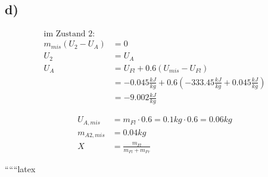 

\subsection*{d)}

\begin{align*}
\text{im Zustand 2:} \\
m_{mis} (U_2 - U_A) &= 0 \\
U_2 &= U_A \\
U_A &= U_{Fl} + 0.6 \left( U_{mis} - U_{Fl} \right) \\
&= -0.045 \frac{kJ}{kg} + 0.6 \left( -333.45 \frac{kJ}{kg} + 0.045 \frac{kJ}{kg} \right) \\
&= -9.002 \frac{kJ}{kg}
\end{align*}

\begin{align*}
U_{A, mis} &= m_{Fl} \cdot 0.6 = 0.1kg \cdot 0.6 = 0.06kg \\
m_{A2, mis} &= 0.04kg \\
X &= \frac{m_{Fl}}{m_{Fl} + m_{Fr}}
\end{align*}

``````latex